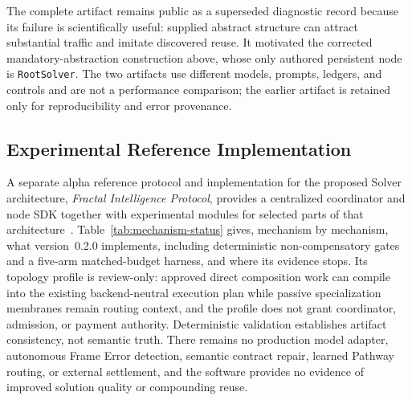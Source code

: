 \documentclass[11pt]{article}
\let\oldtexttt\texttt
\renewcommand{\texttt}[1]{\oldtexttt{\small #1}}
\begin{document}
The complete artifact remains public as a superseded diagnostic record because its failure is scientifically useful: supplied abstract structure can attract substantial traffic and imitate discovered reuse. It motivated the corrected mandatory-abstraction construction above, whose only authored persistent node is \texttt{RootSolver}. The two artifacts use different models, prompts, ledgers, and controls and are not a performance comparison; the earlier artifact is retained only for reproducibility and error provenance.

\subsection{Experimental Reference Implementation}
\label{sec:reference-implementation}

A separate alpha reference protocol and implementation for the proposed Solver architecture, \emph{Fractal Intelligence Protocol}, provides a centralized coordinator and node SDK together with experimental modules for selected parts of that architecture~\cite{westerberg2026fiprotocol}. Table~\ref{tab:mechanism-status} gives, mechanism by mechanism, what version~0.2.0 implements, including deterministic non-compensatory gates and a five-arm matched-budget harness, and where its evidence stops. Its topology profile is review-only: approved direct composition work can compile into the existing backend-neutral execution plan while passive specialization membranes remain routing context, and the profile does not grant coordinator, admission, or payment authority. Deterministic validation establishes artifact consistency, not semantic truth. There remains no production model adapter, autonomous Frame Error detection, semantic contract repair, learned Pathway routing, or external settlement, and the software provides no evidence of improved solution quality or compounding reuse.
\end{document}
